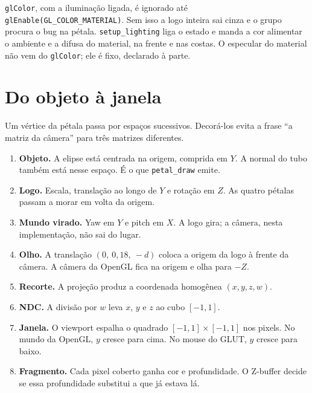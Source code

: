 \documentclass[11pt,a4paper]{article}
\newcommand{\fn}[1]{\texttt{\nobreak\hspace{0pt}#1}}
\begin{document}
\fn{glColor}, com a iluminação ligada, é ignorado até \fn{glEnable(GL\_COLOR\_MATERIAL)}. Sem isso a logo inteira sai cinza e o grupo procura o bug na pétala. \fn{setup\_lighting} liga o estado e manda a cor alimentar o ambiente e a difusa do material, na frente e nas costas. O especular do material não vem do \fn{glColor}; ele é fixo, declarado à parte.

\section{Do objeto à janela}
\label{sec:espacos}

Um vértice da pétala passa por espaços sucessivos. Decorá-los evita a frase ``a matriz da câmera'' para três matrizes diferentes.

\begin{enumerate}
\item \textbf{Objeto.} A elipse está centrada na origem, comprida em \(Y\). A normal do tubo também está nesse espaço. É o que \fn{petal\_draw} emite.
\item \textbf{Logo.} Escala, translação ao longo de \(Y\) e rotação em \(Z\). As quatro pétalas passam a morar em volta da origem.
\item \textbf{Mundo virado.} Yaw em \(Y\) e pitch em \(X\). A logo gira; a câmera, nesta implementação, não sai do lugar.
\item \textbf{Olho.} A translação \((0,\ 0{,}18,\ -d)\) coloca a origem da logo à frente da câmera. A câmera da OpenGL fica na origem e olha para \(-Z\).
\item \textbf{Recorte.} A projeção produz a coordenada homogênea \((x, y, z, w)\).
\item \textbf{NDC.} A divisão por \(w\) leva \(x\), \(y\) e \(z\) ao cubo \([-1, 1]\).
\item \textbf{Janela.} O viewport espalha o quadrado \([-1, 1]\times[-1, 1]\) nos pixels. No mundo da OpenGL, \(y\) cresce para cima. No mouse do GLUT, \(y\) cresce para baixo.
\item \textbf{Fragmento.} Cada pixel coberto ganha cor e profundidade. O Z-buffer decide se essa profundidade substitui a que já estava lá.
\end{enumerate}
\end{document}
